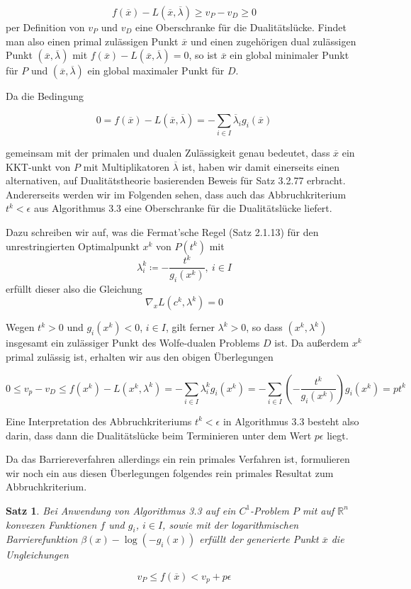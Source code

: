 \documentclass[11pt]{scrreprt}
\newcounter{thm}
\theoremstyle{thmstyle}
\numberwithin{thm}{section}
\newtheorem{satz}[thm]{Satz}
\begin{document}
$$ f(\overline{x}) - L(\overline{x}, \overline{\lambda}) \geq v_P - v_D \geq 0 $$
per Definition von $v_P$ und $v_D$ eine Oberschranke für die Dualitätslücke. Findet man also einen primal zulässigen Punkt $\overline{x}$ und einen zugehörigen dual zulässigen Punkt $(\overline{x}, \overline{\lambda})$ mit $f (\overline{x}) - L(\overline{x}, \overline{\lambda}) = 0$, so ist $\overline{x}$ ein global minimaler Punkt für $P$ und $(\overline{x}, \overline{\lambda})$ ein global maximaler Punkt für $D$. ~\bigskip

Da die Bedingung

	$$ 0 = f(\overline{x}) - L(\overline{x}, \overline{\lambda}) = - \sum_{i \in I} \overline{\lambda}_i g_i(\overline{x}) $$

gemeinsam mit der primalen und dualen Zulässigkeit genau bedeutet, dass $\overline{x}$ ein KKT-unkt von $P$ mit Multiplikatoren $\overline{\lambda}$ ist, haben wir damit einerseits einen alternativen, auf Dualitätstheorie basierenden Beweis für Satz 3.2.77 erbracht. Andererseits werden wir im Folgenden sehen, dass auch das Abbruchkriterium $t^k < \epsilon$ aus Algorithmus 3.3 eine Oberschranke für die Dualitätslücke liefert. ~\bigskip

Dazu schreiben wir auf, was die Fermat’sche Regel (Satz 2.1.13) für den unrestringierten Optimalpunkt $x^k$ von $P(t^k)$ mit
$$ \lambda_i^k \coloneqq - \frac{t^k}{g_i(x^k)}, ~ i \in I $$
erfüllt dieser also die Gleichung
$$ \nabla_x L(c^k, \lambda^k) = 0 $$

Wegen $t^k > 0$ und $g_i(x^k) < 0$, $i \in I$, gilt ferner $\lambda^k > 0$, so dass $(x^k , \lambda^k)$ insgesamt ein zulässiger Punkt des Wolfe-dualen Problems $D$ ist. Da außerdem $x^k$ primal zulässig ist, erhalten wir aus den obigen Überlegungen

	$$ 0 \leq v_p - v_D \leq f(x^k) - L(x^k, \lambda^k) = - \sum_{i \in I} \lambda_i^k g_i(x^k)= - \sum_{i \in I} \left( - \frac{t^k}{g_i(x^k)} \right) g_i(x^k) = p t^k $$

Eine Interpretation des Abbruchkriteriums $t^k < \epsilon$ in Algorithmus 3.3 besteht also darin, dass dann die Dualitätslücke beim Terminieren unter dem Wert $p \epsilon$ liegt. ~\bigskip

Da das Barriereverfahren allerdings ein rein primales Verfahren ist, formulieren wir noch ein aus diesen Überlegungen folgendes rein primales Resultat zum Abbruchkriterium.

\begin{satz}
	Bei Anwendung von Algorithmus 3.3 auf ein $C^1$-Problem $P$ mit auf $\mathbb{R}^n$ konvexen Funktionen $f$ und $g_i$, $i \in I$, sowie mit der logarithmischen Barrierefunktion $\beta(x) - \log \left(- g_i(x) \right)$ erfüllt der generierte Punkt $\overline{x}$ die Ungleichungen 

	$$ v_P \leq f(\overline{x}) < v_p + p \epsilon $$
\end{satz}
\end{document}
